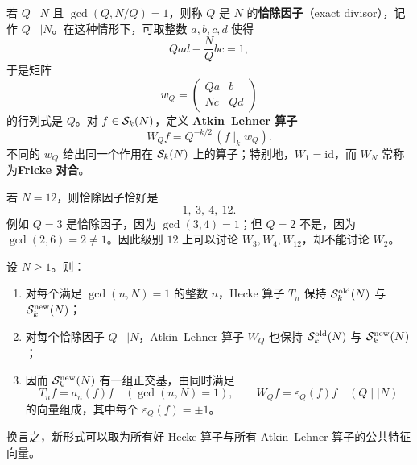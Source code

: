 \begin{definition}
\label{def:atkin-lehner}
若 $Q\mid N$ 且 $\gcd(Q,N/Q)=1$，则称 $Q$ 是 $N$ 的\textbf{恰除因子}（exact divisor），记作
$Q\mid\mid N$。在这种情形下，可取整数 $a,b,c,d$ 使得
\[
  Qad-\frac{N}{Q}bc=1,
\]
于是矩阵
\[
  w_Q=
  \begin{pmatrix}
    Qa & b\\
    Nc & Qd
  \end{pmatrix}
\]
的行列式是 $Q$。对 $f\in \mathcal{S}_k(N)$，定义 \textbf{Atkin--Lehner 算子}
\[
  W_Qf = Q^{-k/2}\,(f\mid_k w_Q).
\]
不同的 $w_Q$ 给出同一个作用在 $\mathcal{S}_k(N)$ 上的算子；特别地，$W_1=\mathrm{id}$，而 $W_N$ 常称为\textbf{Fricke 对合}。
\end{definition}

\begin{example}[恰除因子的样子]
若 $N=12$，则恰除因子恰好是
\[
  1,\ 3,\ 4,\ 12.
\]
例如 $Q=3$ 是恰除因子，因为 $\gcd(3,4)=1$；但 $Q=2$ 不是，因为
$\gcd(2,6)=2\neq 1$。因此级别 $12$ 上可以讨论 $W_3,W_4,W_{12}$，却不能讨论 $W_2$。
\end{example}

\begin{theorem}[新空间上的同时对角化]
\label{thm:newforms-eigen}
设 $N\ge 1$。则：
\begin{enumerate}
  \item 对每个满足 $\gcd(n,N)=1$ 的整数 $n$，Hecke 算子 $T_n$ 保持
        $\mathcal{S}_k^{\mathrm{old}}(N)$ 与 $\mathcal{S}_k^{\mathrm{new}}(N)$；
  \item 对每个恰除因子 $Q\mid\mid N$，Atkin--Lehner 算子 $W_Q$ 也保持
        $\mathcal{S}_k^{\mathrm{old}}(N)$ 与 $\mathcal{S}_k^{\mathrm{new}}(N)$；
  \item 因而 $\mathcal{S}_k^{\mathrm{new}}(N)$ 有一组正交基，由同时满足
        \[
          T_n f=a_n(f)f\quad (\gcd(n,N)=1),
          \qquad
          W_Qf=\varepsilon_Q(f)f\quad (Q\mid\mid N)
        \]
        的向量组成，其中每个 $\varepsilon_Q(f)=\pm 1$。
\end{enumerate}
换言之，新形式可以取为所有好 Hecke 算子与所有 Atkin--Lehner 算子的公共特征向量。
\end{theorem}

